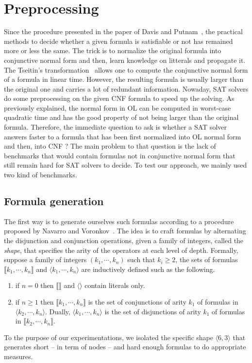 \documentclass[a4paper, 11pt]{article}
\begin{document}
    \section{Preprocessing}
    Since the procedure presented in the paper of Davis and Putnam~\cite{10.1145/321033.321034}, the
    practical methods to decide whether a given formula is satisfiable or not has remained more or less
    the same. The trick is to normalize the original formula into conjunctive normal form and then,
    learn knowledge on litterals and propagate it. The Tseitin's transformation~\cite{Tseitin1983} 
    allows one to compute
    the conjunctive normal form of a formula in linear time. However, the resulting formula is usually
    larger than the original one and carries a lot of redundant information. Nowaday, SAT solvers do
    some preprocessing on the given CNF formula to speed up the solving. As previously explained, the
    normal form in OL can be computed in worst-case quadratic time and has the good property of not
    being larger than the original formula. Therefore, the immediate question to ask is whether a SAT
    solver answers faster to a formula that has been first normalized into OL normal form and then, into 
    CNF ? The main problem to that question is the lack of benchmarks that would contain
    formulas not in conjunctive normal form that still remain hard for
    SAT solvers to decide. To test our approach, we mainly used two kind of benchmarks.
    \subsection{Formula generation}
    The first way is to generate ourselves such formulas according to a procedure
    proposed by Navarro and Voronkov~\cite{11cf478fe9d5463eb66cfafaa9577771}. The idea is to craft
    formulas by alternating the disjunction and conjunction operations, given a family of integers,
    called the \textit{shape}, that specifies the arity of the operators at each level of depth. 
    Formally,
    suppose a family of integers $(k_1,\cdots,k_n)$ such that $k_i\ge 2$, the sets of formulas
    $\llbracket k_1,\cdots,k_n\rrbracket$ and $\langle k_1,\cdots,k_n\rangle$ are inductively defined
    such as the following.
    \begin{enumerate}
	    \item
		if $n=0$ then $\llbracket\rrbracket$ and $\langle\rangle$ contain literals only.
	\item
		if $n\ge 1$ then $\llbracket k_1,\cdots,k_n\rrbracket$ is the set of conjunctions
		    of arity $k_1$ of formulas in $\langle k_2,\cdots,k_n\rangle$. Dually,
		    $\langle k_1,\cdots,k_n\rangle$ is the set of disjunctions of arity $k_1$ of
		    formulas in $\llbracket k_2,\cdots,k_n\rrbracket$.
    \end{enumerate}
    To the purpose of our experimentations, we isolated the specific shape $\langle 6,3\rangle$ that
    generates short -- in term of nodes -- and hard enough formulas to do appropriate measures.
\end{document}
